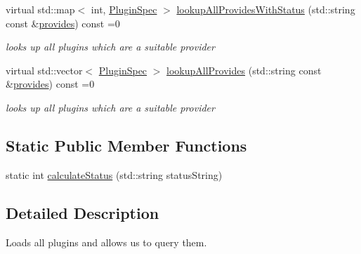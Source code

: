 \begin{DoxyCompactItemize}
virtual std\+::map$<$ int, \hyperlink{classkdb_1_1tools_1_1PluginSpec}{Plugin\+Spec} $>$ \hyperlink{classkdb_1_1tools_1_1PluginDatabase_aa918b547973f627a5604fa3b2b3faf30}{lookup\+All\+Provides\+With\+Status} (std\+::string const \&\hyperlink{classkdb_1_1tools_1_1PluginDatabase_afc91ff760616ee83c6afb70e5a2f0601a73ff10d6a07213c277db4326b3df6c4b}{provides}) const =0
\begin{DoxyCompactList}\small\item\em looks up all plugins which are a suitable provider \end{DoxyCompactList}\item 
virtual std\+::vector$<$ \hyperlink{classkdb_1_1tools_1_1PluginSpec}{Plugin\+Spec} $>$ \hyperlink{classkdb_1_1tools_1_1PluginDatabase_a3ed261ad8562c423b64cf34cbc086161}{lookup\+All\+Provides} (std\+::string const \&\hyperlink{classkdb_1_1tools_1_1PluginDatabase_afc91ff760616ee83c6afb70e5a2f0601a73ff10d6a07213c277db4326b3df6c4b}{provides}) const =0
\begin{DoxyCompactList}\small\item\em looks up all plugins which are a suitable provider \end{DoxyCompactList}\end{DoxyCompactItemize}
\subsection*{Static Public Member Functions}
\begin{DoxyCompactItemize}
\item 
static int \hyperlink{classkdb_1_1tools_1_1PluginDatabase_ab901b98a6c7661bbccffa8ab9ff62dc6}{calculate\+Status} (std\+::string status\+String)
\end{DoxyCompactItemize}


\subsection{Detailed Description}
Loads all plugins and allows us to query them. 


